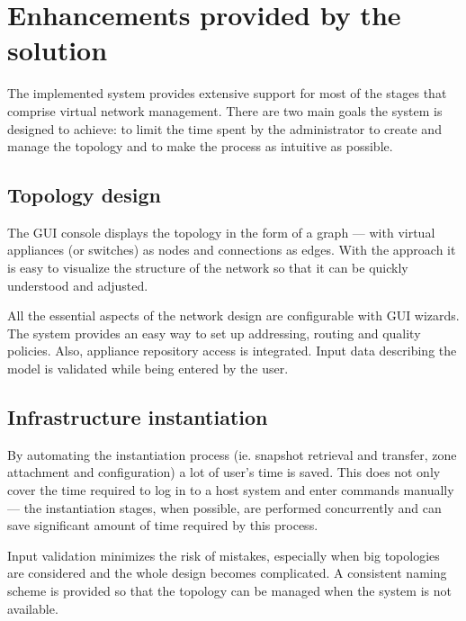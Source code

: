 \documentclass[11pt]{book}
\begin{document}
    \section{Enhancements provided by the solution}
    \label{sec:uc:enhance}

      The implemented system provides extensive support for most of the stages that comprise virtual network management.
      There are two main goals the system is designed to achieve: to limit the time spent by the administrator to create
      and manage the topology and to make the process as intuitive as possible.


      \subsection{Topology design}
      \label{sub:uc:enhance:design}

        The GUI console displays the topology in the form of a graph --- with virtual appliances (or switches) as nodes
        and connections as edges. With the approach it is easy to visualize the structure of the network so that it can
        be quickly understood and adjusted.

        All the essential aspects of the network design are configurable with GUI wizards. The system provides an easy
        way to set up addressing, routing and quality policies. Also, appliance repository access is integrated. Input
        data describing the model is validated while being entered by the user. 


      \subsection{Infrastructure instantiation}
      \label{sub:uc:enhance:instantiation}

        By automating the instantiation process (ie. snapshot retrieval and transfer, zone attachment and configuration)
        a lot of user's time is saved. This does not only cover the time required to log in to a host system and enter
        commands manually --- the instantiation stages, when possible, are performed concurrently and can save
        significant amount of time required by this process.

        Input validation minimizes the risk of mistakes, especially when big topologies are considered and the whole
        design becomes complicated. A consistent naming scheme is provided so that the topology can be managed when the
        system is not available.
\end{document}
